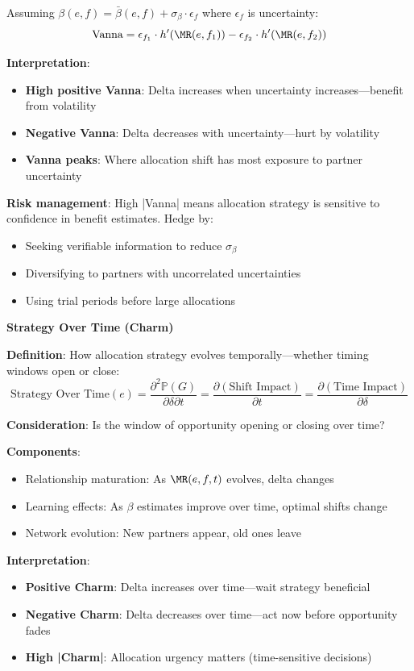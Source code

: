 Assuming $\beta(e,f) = \bar{\beta}(e,f) + \sigma_\beta \cdot \epsilon_f$ where $\epsilon_f$ is uncertainty:
\[ \text{Vanna} = \epsilon_{f_1} \cdot h'(\MR(e,f_1)) - \epsilon_{f_2} \cdot h'(\MR(e,f_2)) \]

\textbf{Interpretation}:
\begin{itemize}
\item \textbf{High positive Vanna}: Delta increases when uncertainty increases---benefit from volatility
\item \textbf{Negative Vanna}: Delta decreases with uncertainty---hurt by volatility
\item \textbf{Vanna peaks}: Where allocation shift has most exposure to partner uncertainty
\end{itemize}

\textbf{Risk management}: High |Vanna| means allocation strategy is sensitive to confidence in benefit estimates. Hedge by:
\begin{itemize}
\item Seeking verifiable information to reduce $\sigma_\beta$
\item Diversifying to partners with uncorrelated uncertainties
\item Using trial periods before large allocations
\end{itemize}

\textbf{Strategy Over Time (Charm)}

\textbf{Definition}: How allocation strategy evolves temporally---whether timing windows open or close:
\[ \text{Strategy Over Time}(e) = \frac{\partial^2 \mathbb{P}(G)}{\partial \delta \partial t} = \frac{\partial (\text{Shift Impact})}{\partial t} = \frac{\partial (\text{Time Impact})}{\partial \delta} \]

\textbf{Consideration}: Is the window of opportunity opening or closing over time?

\textbf{Components}:
\begin{itemize}
\item Relationship maturation: As $\MR(e,f,t)$ evolves, delta changes
\item Learning effects: As $\beta$ estimates improve over time, optimal shifts change
\item Network evolution: New partners appear, old ones leave
\end{itemize}

\textbf{Interpretation}:
\begin{itemize}
\item \textbf{Positive Charm}: Delta increases over time---wait strategy beneficial
\item \textbf{Negative Charm}: Delta decreases over time---act now before opportunity fades
\item \textbf{High |Charm|}: Allocation urgency matters (time-sensitive decisions)
\end{itemize}

